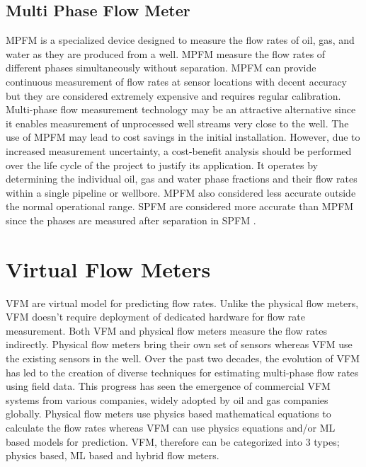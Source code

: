 \documentclass[12pt,APA]{uomthesis}
\begin{document}
\subsection{Multi Phase Flow Meter}
MPFM is a specialized device designed to measure the flow rates of oil, gas, and water as they are produced from a well. MPFM measure the flow rates of different phases simultaneously without separation. MPFM can provide continuous measurement of flow rates at sensor locations with decent accuracy but they are considered extremely expensive and requires regular calibration. Multi-phase flow measurement technology may be an attractive alternative since it enables measurement of unprocessed well streams very close to the well. The use of MPFM may lead to cost savings in the initial installation. However, due to increased measurement uncertainty, a cost-benefit analysis should be performed over the life cycle of the project to justify its application. It operates by determining the individual oil, gas and water phase fractions and their flow rates within a single pipeline or wellbore. MPFM also considered less accurate outside the normal operational range. SPFM are considered more accurate than MPFM since the phases are measured after separation in SPFM \citep{meribout2020multiphase}. 

\section{Virtual Flow Meters}
VFM are virtual model for predicting flow rates. Unlike the physical flow meters, VFM doesn't require deployment of dedicated hardware for flow rate measurement. Both VFM and physical flow meters measure the flow rates indirectly. Physical flow meters bring their own set of sensors whereas VFM use the existing sensors in the well. Over the past two decades, the evolution of VFM has led to the creation of diverse techniques for estimating multi-phase flow rates using field data. This progress has seen the emergence of commercial VFM systems from various companies, widely adopted by oil and gas companies globally. Physical flow meters use physics based mathematical equations to calculate the flow rates whereas VFM can use physics equations and/or ML based models for prediction. VFM, therefore can be categorized into 3 types; physics based, ML based and hybrid flow meters.
\end{document}
